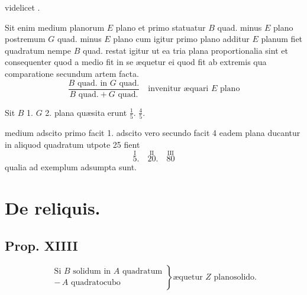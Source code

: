 \documentclass[11pt,a4paper]{article}
\begin{document}
\ill{} videlicet .

Sit enim medium planorum $E$ plano et primo statuatur $B$ quad. minus $E$ plano postremum $G$ quad. minus $E$ plano cum igitur primo plano additur $E$ planum fiet quadratum nempe $B$ quad. restat igitur ut ea tria plana proportionalia sint et consequenter quod a medio fit in se æquetur ei quod fit ab extremis qua comparatione secundum artem facta.
\[ \frac{B \text{ quad. in } G \text{ quad.}}{B \text{ quad.} + G \text{ quad.}} \quad \text{invenitur æquari } E \text{ plano} \]


Sit $B$ 1. $G$ 2. plana quæsita erunt $\frac{1}{5}$. $\frac{4}{5}$. 

medium adscito primo facit 1. adscito vero secundo facit 4 eadem plana ducantur in aliquod quadratum utpote 25 fient
\[ \overset{\text{I}}{5}. \quad \overset{\text{II}}{20}. \quad \overset{\text{III}}{80} \]
qualia ad exemplum adsumpta sunt.

\section*{De reliquis.}

\subsection*{Prop. XIIII}

\[ \left. \begin{array}{l} \text{Si } B \text{ solidum in } A \text{ quadratum} \\ -\,A \text{ quadratocubo} \end{array} \right\} \text{æquetur } Z \text{ planosolido.} \]
\end{document}
